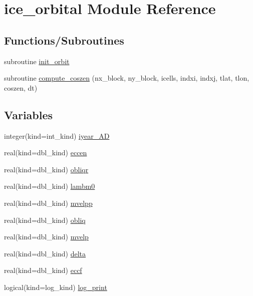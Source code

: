 \hypertarget{namespaceice__orbital}{
\section{ice\_\-orbital Module Reference}
\label{namespaceice__orbital}
}
\subsection*{Functions/Subroutines}
\begin{DoxyCompactItemize}
\item 
subroutine \hyperlink{namespaceice__orbital_a2bb0fda98ea9e34715f91802df7c8e9c}{init\_\-orbit}
\item 
subroutine \hyperlink{namespaceice__orbital_a874f1fc41f0a366a196e53b9c8d13d85}{compute\_\-coszen} (nx\_\-block, ny\_\-block, icells, indxi, indxj, tlat, tlon, coszen, dt)
\end{DoxyCompactItemize}
\subsection*{Variables}
\begin{DoxyCompactItemize}
\item 
integer(kind=int\_\-kind) \hyperlink{namespaceice__orbital_adb48d087f6d15eae3b858c4347ae2da3}{iyear\_\-AD}
\item 
real(kind=dbl\_\-kind) \hyperlink{namespaceice__orbital_a24946bf121e343b1a874b8ca4f5cd700}{eccen}
\item 
real(kind=dbl\_\-kind) \hyperlink{namespaceice__orbital_a574192fd5a271f5addcbae852d673307}{obliqr}
\item 
real(kind=dbl\_\-kind) \hyperlink{namespaceice__orbital_aecd1e54c58dfa1c5f8c3c01250020047}{lambm0}
\item 
real(kind=dbl\_\-kind) \hyperlink{namespaceice__orbital_ac06fd0600b7af9337b89ab60e896d2a1}{mvelpp}
\item 
real(kind=dbl\_\-kind) \hyperlink{namespaceice__orbital_ab9294c89b23f79319e267acbe36054ae}{obliq}
\item 
real(kind=dbl\_\-kind) \hyperlink{namespaceice__orbital_a60cdda9eb0a01c43d7c74579bf173c35}{mvelp}
\item 
real(kind=dbl\_\-kind) \hyperlink{namespaceice__orbital_a2c094e1198e636bcaa1810e5730490a9}{delta}
\item 
real(kind=dbl\_\-kind) \hyperlink{namespaceice__orbital_a01d96908c345645e4dd439536e32eaba}{eccf}
\item 
logical(kind=log\_\-kind) \hyperlink{namespaceice__orbital_a1b10ff11977a2b2d6c6d830897a29597}{log\_\-print}
\end{DoxyCompactItemize}


